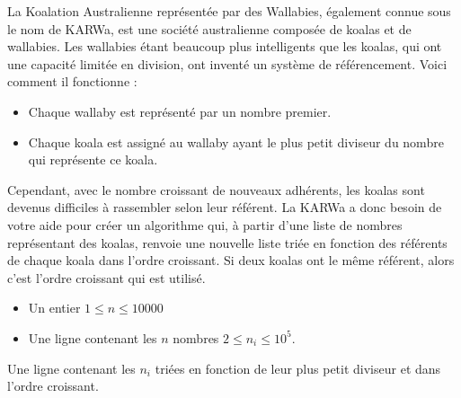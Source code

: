 \problemname{\problemyamlname}

La Koalation Australienne représentée par des Wallabies, également connue sous le nom de KARWa, est une société australienne composée de koalas et de wallabies. Les wallabies étant beaucoup plus intelligents que les koalas, qui ont une capacité limitée en division, ont inventé un système de référencement. Voici comment il fonctionne :

\begin{itemize}
	\item Chaque wallaby est représenté par un nombre premier.
	\item Chaque koala est assigné au wallaby ayant le plus petit diviseur du nombre qui représente ce koala.
\end{itemize}
Cependant, avec le nombre croissant de nouveaux adhérents, les koalas sont devenus difficiles à rassembler selon leur référent. La KARWa a donc besoin de votre aide pour créer un algorithme qui, à partir d'une liste de nombres représentant des koalas, renvoie une nouvelle liste triée en fonction des référents de chaque koala dans l'ordre croissant. Si deux koalas ont le même référent, alors c'est l'ordre croissant qui est utilisé.

\begin{Input}
	\begin{itemize}
		\item Un entier $1 \leq n \leq 10 000$
		\item Une ligne contenant les $n$ nombres $2 \leq n_i \leq 10^5$.
	\end{itemize}
\end{Input}

\begin{Output}
	Une ligne contenant les $n_i$ triées en fonction de leur plus petit diviseur et dans l'ordre croissant.
\end{Output}
